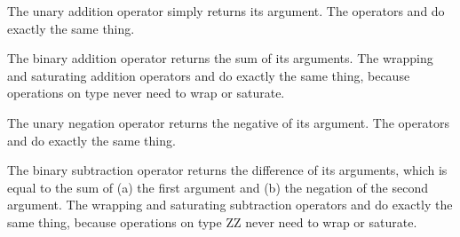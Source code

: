 The unary addition operator \EXP{+} simply returns its argument.
The operators \EXP{\boxplus} and \EXP{\dotplus} do exactly the same thing.


The binary addition operator \EXP{+} returns the sum of its arguments.
The wrapping and saturating addition operators \EXP{\boxplus} and \EXP{\dotplus} do exactly the same thing,
because operations on type  never need to wrap or saturate.



The unary negation operator \EXP{-} returns the negative of its argument.
The operators \EXP{\boxminus} and \EXP{\dotminus} do exactly the same thing.



The binary subtraction operator \EXP{-} returns the difference of its arguments,
which is equal to the sum of (a) the first argument and (b) the negation of the second argument.
The wrapping and saturating subtraction operators \EXP{\boxminus} and \EXP{\dotminus} do exactly the same thing,
because operations on type ZZ never need to wrap or saturate.



